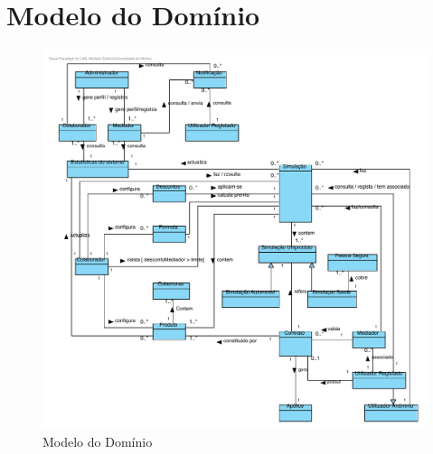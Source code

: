 \section{Modelo do Domínio}
\begin{figure}
	\centering	
	\includegraphics[scale=0.8]{images/Prints/modeloDominio.pdf}
	\caption{Modelo do Domínio}
\end{figure}

\pagebreak